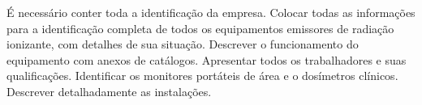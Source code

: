 \documentclass[
	12pt,				%
    oneside,			%
	a4paper,			%
	english,			%
	french,				%
	spanish,			%
	brazil,				%
	]{abntex2}
\begin{document}
É necessário conter toda a identificação da empresa. Colocar todas as informações para a identificação completa de todos os equipamentos emissores de radiação ionizante, com detalhes de sua situação. Descrever o funcionamento do equipamento com anexos de catálogos. Apresentar todos os trabalhadores e suas qualificações. Identificar os monitores portáteis de área e o dosímetros clínicos. Descrever detalhadamente as instalações.





\postextual



%
%






\end{document}

